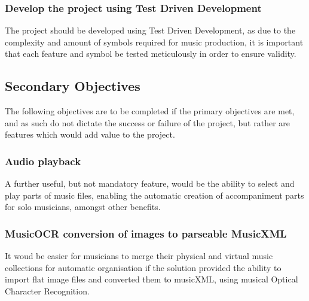 \subsubsection{Develop the project using Test Driven Development}
The project should be developed using Test Driven Development, as due to the complexity and amount of symbols required for music production, it is important that each feature and symbol be tested meticulously in order to ensure validity.
\subsection{Secondary Objectives}
The following objectives are to be completed if the primary objectives are met, and as such do not dictate the success or failure of the project, but rather are features which would add value to the project.
\subsubsection{Audio playback}
A further useful, but not mandatory feature, would be the ability to select and play parts of music files, enabling the automatic creation of accompaniment parts for solo musicians, amongst other benefits.
\subsubsection{MusicOCR conversion of images to parseable MusicXML}
It woud be easier for musicians to merge their physical and virtual music collections for automatic organisation if the solution provided the ability to import flat image files and converted them to musicXML, using musical Optical Character Recognition. 